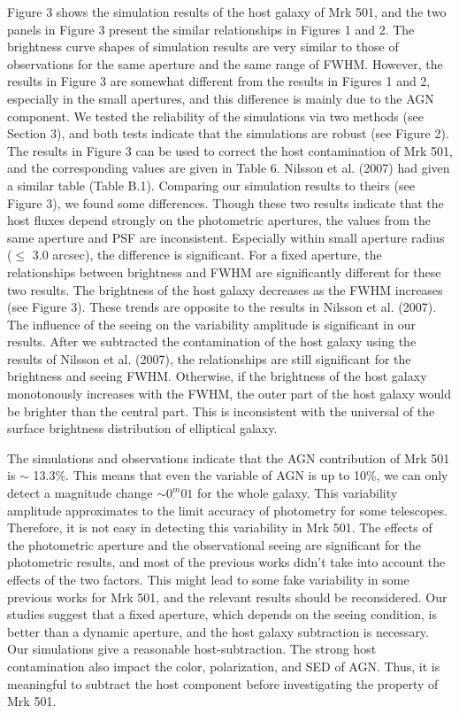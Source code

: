 \documentclass[structabstract]{raa}
\begin{document}
   Figure 3 shows the simulation results of the host galaxy of Mrk 501,  and the two panels in Figure 3 present the similar relationships in
   Figures 1 and 2. The brightness curve shapes of simulation results are very similar to those of observations for the same aperture and
   the same range of FWHM. However, the results in Figure 3 are somewhat different from the results in Figures 1 and 2, especially in the
   small apertures, and this difference is mainly due to the AGN component. We tested the reliability of the simulations via two methods
   (see Section 3), and both tests indicate that the simulations are robust (see Figure 2). The results in Figure 3 can be used to correct the
   host contamination of Mrk 501, and the corresponding values are given in Table 6. Nilsson et al. (2007) had given a similar table (Table B.1). Comparing our simulation results to theirs (see Figure 3), we found some differences. Though these two results indicate that the host
   fluxes depend strongly on the photometric apertures, the values from the same aperture and PSF are inconsistent. Especially within
   small aperture radius ($\leq$ 3.0 arcsec), the difference is significant. For a fixed aperture, the relationships between brightness and
   FWHM are significantly different for these two results. The brightness of the host galaxy decreases as the FWHM increases (see Figure 3).
   These trends are opposite to the results in Nilsson et al. (2007). The influence of the seeing on the variability amplitude is significant
   in our results. After we subtracted the contamination of the host galaxy using the results of Nilsson et al. (2007), the relationships are
   still significant for the brightness and seeing FWHM. Otherwise, if the brightness of the host galaxy monotonously increases with the
   FWHM, the outer part of the host galaxy would be brighter than the central part. This is inconsistent with the universal of the surface
   brightness distribution of elliptical galaxy.

   The simulations and observations indicate that the AGN contribution of Mrk 501 is $\sim$ 13.3\%. This means that even the variable
   of AGN is up to 10\%, we can only detect a magnitude change $\sim 0^{m}_{\cdot}01$ for the whole galaxy. This variability amplitude
   approximates to the limit accuracy of photometry for some telescopes. Therefore, it is not easy in detecting this variability in Mrk 501.
   The effects of the photometric aperture and the observational seeing are significant for the photometric results, and most of the previous
   works didn't take into account the effects of the two factors. This might lead to some fake variability in some previous works for Mrk 501,
   and the relevant results should be reconsidered. Our studies suggest that a fixed aperture, which depends on the seeing condition, is better
   than a dynamic aperture, and the host galaxy subtraction is necessary. Our simulations give a reasonable host-subtraction. The strong
   host contamination also impact the color, polarization, and SED of AGN. Thus, it is meaningful to subtract the host component before
   investigating the property of Mrk 501.
\end{document}
